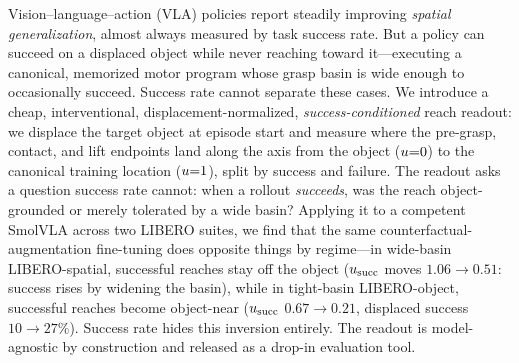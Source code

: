 Vision--language--action (VLA) policies report steadily improving \emph{spatial
generalization}, almost always measured by task success rate. But a policy can
succeed on a displaced object while never reaching toward it---executing a canonical,
memorized motor program whose grasp basin is wide enough to occasionally succeed.
Success rate cannot separate these cases. We introduce a cheap, interventional,
displacement-normalized, \emph{success-conditioned} reach readout: we displace the
target object at episode start and measure where the pre-grasp, contact, and lift
endpoints land along the axis from the object ($u{=}0$) to the canonical training
location ($u{=}1$), split by success and failure. The readout asks a question success
rate cannot: when a rollout \emph{succeeds}, was the reach object-grounded or merely
tolerated by a wide basin? Applying it to a competent SmolVLA across two LIBERO suites,
we find that the same counterfactual-augmentation fine-tuning does opposite things by
regime---in wide-basin LIBERO-spatial, successful reaches stay off the object
($u_{\mathrm{succ}}$ moves $1.06{\to}0.51$: success rises by widening the basin), while in
tight-basin LIBERO-object, successful reaches become object-near
($u_{\mathrm{succ}}$ $0.67{\to}0.21$, displaced success $10{\to}27\%$). Success rate hides this
inversion entirely. The readout is model-agnostic by construction and released as a
drop-in evaluation tool.
